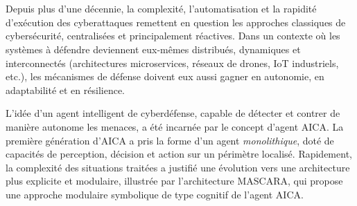 \documentclass[ twoside,openright,titlepage,numbers=noenddot,headinclude,%
                footinclude=true,cleardoublepage=empty,abstractoff, %
                BCOR=5mm,paper=a4,fontsize=11pt,%
                french,american,%
                ]{scrreprt}
\begin{document}
\frenchspacing
\raggedbottom
{} %
\pagestyle{plain}




\cleardoublepage
\cleardoublepage

\cleardoublepage 
\pagestyle{scrheadings}
\cleardoublepage 

\cleardoublepage{}
\cleardoublepage
{}
{}

\

\vspace{1em}

\bigskip

\\

Depuis plus d'une décennie, la complexité, l'automatisation et la rapidité d'exécution des cyberattaques remettent en question les approches classiques de cybersécurité, centralisées et principalement réactives. Dans un contexte où les systèmes à défendre deviennent eux-mêmes distribués, dynamiques et interconnectés (architectures microservices, réseaux de drones, IoT industriels, etc.), les mécanismes de défense doivent eux aussi gagner en autonomie, en adaptabilité et en résilience.

L'idée d'un agent intelligent de cyberdéfense, capable de détecter et contrer de manière autonome les menaces, a été incarnée par le concept d'agent \ac{AICA}. La première génération d'AICA a pris la forme d'un agent \textit{monolithique}, doté de capacités de perception, décision et action sur un périmètre localisé. Rapidement, la complexité des situations traitées a justifié une évolution vers une architecture plus explicite et modulaire, illustrée par l'architecture \ac{MASCARA}, qui propose une approche modulaire symbolique de type cognitif de l'agent AICA.
\end{document}
